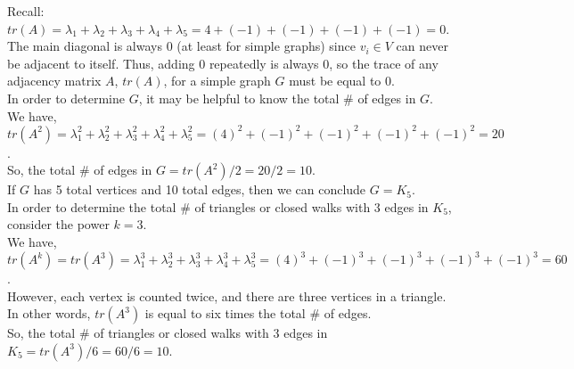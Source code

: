\documentclass{article}
\begin{document}
Recall: $tr(A) = \lambda_1 + \lambda_2 + \lambda_3 + \lambda_4 + \lambda_5  = 4 + (-1) + (-1) + (-1) + (-1) = 0$. \\

The main diagonal is always 0 (at least for simple graphs) since $v_i \in V$ can never be adjacent to itself. Thus, adding 0 repeatedly is always 0, so the trace of any adjacency matrix $A$, $tr(A)$, for a simple graph $G$ must be equal to 0. \\

In order to determine $G$, it may be helpful to know the total \# of edges in $G$. \\

We have, \\

$tr(A^2) = \lambda^2_1 + \lambda^2_2 + \lambda^2_3 + \lambda^2_4 + \lambda^2_5  = (4)^2 + (-1)^2 + (-1)^2 + (-1)^2 + (-1)^2 = 20$. \\

So, the total \# of edges in $G = tr(A^2) / 2 = 20 / 2 = 10$. \\

If $G$ has 5 total vertices and 10 total edges, then we can conclude $G = K_5$. \\

In order to determine the total \# of triangles or closed walks with 3 edges in $K_5$, consider the power $k = 3$. \\

We have, \\

$tr(A^k) = tr(A^3) = \lambda^3_1 + \lambda^3_2 + \lambda^3_3 + \lambda^3_4 + \lambda^3_5 = (4)^3 + (-1)^3 + (-1)^3 + (-1)^3 + (-1)^3 = 60$. \\

However, each vertex is counted twice, and there are three vertices in a triangle. In other words, $tr(A^3)$ is equal to six times the total \# of edges. \\

So, the total \# of triangles or closed walks with 3 edges in $K_5 = tr(A^3) / 6 = 60/6 = 10$. 
\end{document}
